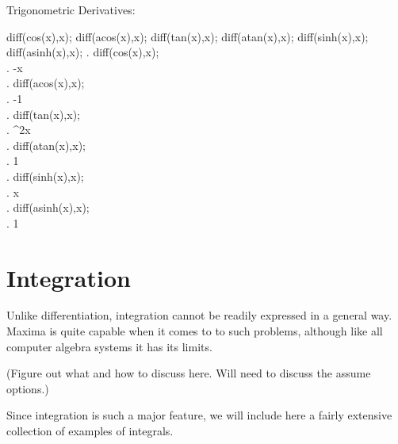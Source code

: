 Trigonometric Derivatives:

\beginmaximasession
diff(cos(x),x);
diff(acos(x),x);
diff(tan(x),x);
diff(atan(x),x);
diff(sinh(x),x);
diff(asinh(x),x);
\maximatexsession
{}.  diff(cos(x),x); \\
.   -\sin x \\
.  diff(acos(x),x); \\
.   -{{1}} \\
.  diff(tan(x),x); \\
.   \sec ^{2}x \\
.  diff(atan(x),x); \\
.   {{1}} \\
.  diff(sinh(x),x); \\
.   \cosh x \\
.  diff(asinh(x),x); \\
.   {{1}} \\
\endmaximasession

\section{Integration}

Unlike differentiation, integration cannot be readily expressed in a general
way.  Maxima is quite capable when it comes to to such problems, although
like all computer algebra systems it has its limits.

(Figure out what and how to discuss here.  Will need to discuss the assume
options.)

Since integration is such a major feature, we will include here a fairly
extensive collection of examples of integrals.


